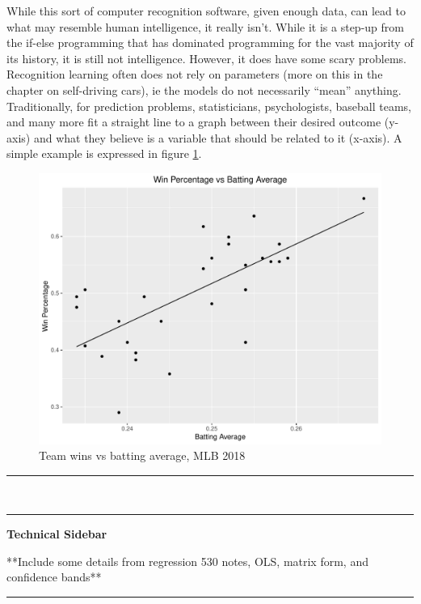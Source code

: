 \documentclass[12pt,twoside]{book}
\begin{document}
	While this sort of computer recognition software, given enough data, can lead to what may resemble human intelligence, it really isn't.  While it is a step-up from the if-else programming that has dominated programming for the vast majority of its history, it is still not intelligence.  However, it does have some scary problems.  Recognition learning often does not rely on parameters (more on this in the chapter on self-driving cars), ie the models do not necessarily ``mean'' anything.  Traditionally, for prediction problems, statisticians, psychologists, baseball teams, and many more fit a straight line to a graph between their desired outcome (y-axis) and what they believe is a variable that should be related to it (x-axis).  A simple example is expressed in figure \ref{figurebaseball}.
	\begin{figure}[h]
		\centering
		\includegraphics[scale=0.5]{baseballpic}
		\caption{Team wins vs batting average, MLB 2018}
		\label{figurebaseball}
	\end{figure}



	\noindent\rule{3cm}{0.6pt}
\\

\vspace{-1.25cm}
\noindent\rule{3cm}{0.6pt}  \textbf{Technical Sidebar}


**Include some details from regression 530 notes, OLS, matrix form, and confidence bands**


\setlength\parindent{9cm}\rule{3cm}{0.6pt}
\\
\end{document}
